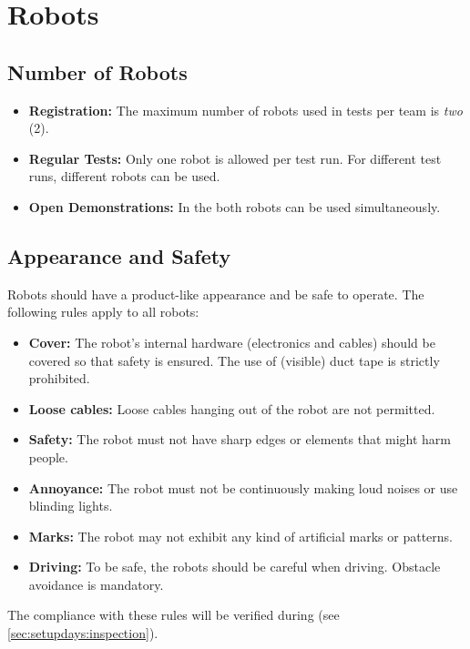 \section{Robots}
\label{sec:rules:robots}

\subsection{Number of Robots}
\label{sec:rules:robotsnumber}

\begin{itemize}
	\item \textbf{Registration:} The maximum number of robots used in tests per team is \emph{two} (2).
	\item \textbf{Regular Tests:} Only one robot is allowed per test run. For different test runs, different robots can be used.
	\item \textbf{Open Demonstrations:} In the  both robots can be used simultaneously.
\end{itemize}

\subsection{Appearance and Safety}
\label{sec:rules:robotappearance}

Robots should have a product-like appearance and be safe to operate. The following rules apply to all robots:
\begin{itemize}
	\item \textbf{Cover:} The robot's internal hardware (electronics and cables) should be covered so that safety is ensured. The use of (visible) duct tape is strictly prohibited.
	\item \textbf{Loose cables:} Loose cables hanging out of the robot are not permitted.
	\item \textbf{Safety:} The robot must not have sharp edges or elements that might harm people.
	\item \textbf{Annoyance:} The robot must not be continuously making loud noises or use blinding lights.
	\item \textbf{Marks:} The robot may not exhibit any kind of artificial marks or patterns.
	\item \textbf{Driving:} To be safe, the robots should be careful when driving. Obstacle avoidance is mandatory.
\end{itemize}

The compliance with these rules will be verified during \RobotInspection{} (see \ref{sec:setupdays:inspection}).







